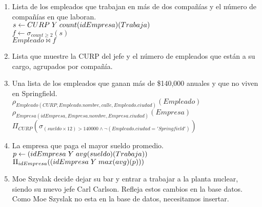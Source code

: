 \documentclass{article}
\begin{document}
\begin{enumerate}
\begin{enumerate}
				\item Lista de los empleados que trabajan en más de dos compañías y el número de compañías en
				que laboran.\\
				
				$s \leftarrow CURP \hspace{1mm} Y \hspace{1mm} count(idEmpresa)(Trabaja)$\\
				$f \leftarrow \sigma_{count \geq 2}(s)$\\
				$Empleado \bowtie f$\\
				
				\item Lista que muestre la CURP del jefe y el número de empleados que están a su cargo, agrupados
				por compañía.
				
				
				
				\item Una lista de los empleados que ganan más de \$140,000 anuales y que no viven en Springfield.\\
				
				$\rho_{Empleado(CURP, Empleado.nombre, calle, Empleado.ciudad)}(Empleado)$\\
				$\rho_{Empresa(idEmpresa, Empresa.nombre, Empresa.ciudad)}(Empresa)$\\
				$\Pi_{CURP}(\sigma_{(sueldo \times 12) > 140 000 \land \lnot(Empleado.ciudad = 'Springfield')})$\\
				
				\item La empresa que paga el mayor sueldo promedio.\\
				
				$p \leftarrow (idEmpresa \hspace{1mm} Y \hspace{1mm} avg(sueldo)(Trabaja))$\\
				$\Pi_{idEmpresa}((idEmpresa \hspace{1mm} Y \hspace{1mm} max(avg)(p)))$\\
				
				\item Moe Szyslak decide dejar su bar y entrar a trabajar a la planta nuclear, siendo su nuevo jefe
				Carl Carlson. Refleja estos cambios en la base datos.\\
				
				Como Moe Szyslak no esta en la base de datos, necesitamos insertar.\\
				

\end{enumerate}
\end{enumerate}
\end{document}
